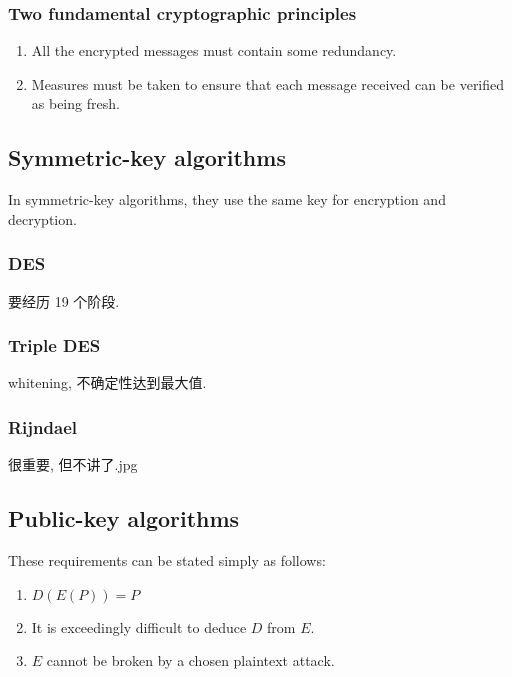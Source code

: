 \subsubsection{Two fundamental cryptographic principles}
\begin{enumerate}
    \item All the encrypted messages must contain some redundancy.
    \item Measures must be taken to ensure that each message received can be verified as being fresh.
\end{enumerate}

\subsection{Symmetric-key algorithms}
In symmetric-key algorithms, they use the same key for encryption and decryption.


\subsubsection{DES}
要经历 19 个阶段. 

\subsubsection{Triple DES}
whitening, 不确定性达到最大值. 

\subsubsection{Rijndael}

很重要, 但不讲了.jpg

\subsection{Public-key algorithms}

These requirements can be stated simply as follows:
\begin{enumerate}
    \item $D(E(P))=P$
    \item It is exceedingly difficult to deduce $D$ from $E$.
    \item $E$ cannot be broken by a chosen plaintext attack.
\end{enumerate}


